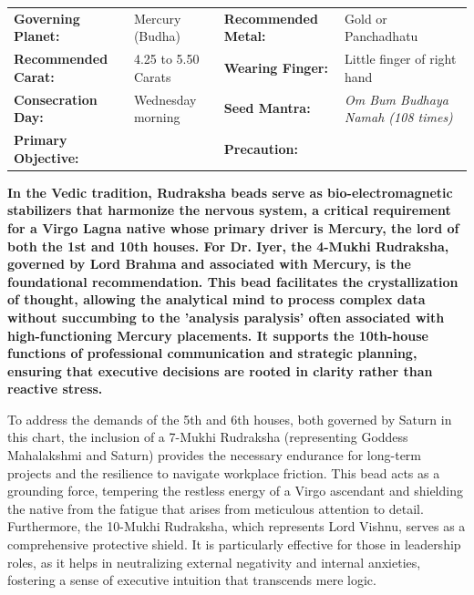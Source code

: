
\begin{executivecard}
  \sffamily\fontsize{8}{11.5}\selectfont
  \begin{tabularx}{\linewidth}{@{}l X l X@{}}
    \textbf{Governing Planet:} & Mercury (Budha) & \textbf{Recommended Metal:} & Gold or Panchadhatu \\
    \textbf{Recommended Carat:} & 4.25 to 5.50 Carats & \textbf{Wearing Finger:} & Little finger of right hand \\
    \textbf{Consecration Day:} & Wednesday morning & \textbf{Seed Mantra:} & \textit{Om Bum Budhaya Namah (108 times)} \\
    \textbf{Primary Objective:} &  & \textbf{Precaution:} &  \\
  \end{tabularx}
\end{executivecard}\vspace{2mm}

\label{topic60}

{\fontsize{9.5}{13.8}\selectfont\bfseries\color{DeepSlate} In the Vedic tradition, Rudraksha beads serve as bio-electromagnetic stabilizers that harmonize the nervous system, a critical requirement for a Virgo Lagna native whose primary driver is Mercury, the lord of both the 1st and 10th houses. For Dr. Iyer, the 4-Mukhi Rudraksha, governed by Lord Brahma and associated with Mercury, is the foundational recommendation. This bead facilitates the crystallization of thought, allowing the analytical mind to process complex data without succumbing to the 'analysis paralysis' often associated with high-functioning Mercury placements. It supports the 10th-house functions of professional communication and strategic planning, ensuring that executive decisions are rooted in clarity rather than reactive stress.}\par\vspace{2mm}

{\fontsize{9}{13}\selectfont To address the demands of the 5th and 6th houses, both governed by Saturn in this chart, the inclusion of a 7-Mukhi Rudraksha (representing Goddess Mahalakshmi and Saturn) provides the necessary endurance for long-term projects and the resilience to navigate workplace friction. This bead acts as a grounding force, tempering the restless energy of a Virgo ascendant and shielding the native from the fatigue that arises from meticulous attention to detail. Furthermore, the 10-Mukhi Rudraksha, which represents Lord Vishnu, serves as a comprehensive protective shield. It is particularly effective for those in leadership roles, as it helps in neutralizing external negativity and internal anxieties, fostering a sense of executive intuition that transcends mere logic.}\par\vspace{1.8mm}

